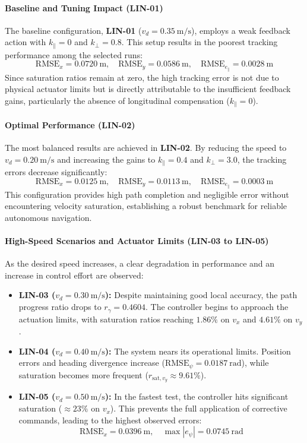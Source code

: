 \paragraph{Baseline and Tuning Impact (LIN-01)}
The baseline configuration, \textbf{LIN-01} ($v_d = 0.35~\mathrm{m/s}$), employs a weak feedback action with $k_{\parallel}=0$ and $k_{\perp}=0.8$. This setup results in the poorest tracking performance among the selected runs:
\[
    \mathrm{RMSE}_x = 0.0720~\mathrm{m}, \quad \mathrm{RMSE}_y = 0.0586~\mathrm{m}, \quad \mathrm{RMSE}_{e_{\parallel}} = 0.0028~\mathrm{m}
\]
Since saturation ratios remain at zero, the high tracking error is not due to physical actuator limits but is directly attributable to the insufficient feedback gains, particularly the absence of longitudinal compensation ($k_{\parallel}=0$).

\paragraph{Optimal Performance (LIN-02)}
The most balanced results are achieved in \textbf{LIN-02}. By reducing the speed to $v_d = 0.20~\mathrm{m/s}$ and increasing the gains to $k_{\parallel}=0.4$ and $k_{\perp}=3.0$, the tracking errors decrease significantly:
\[
    \mathrm{RMSE}_x = 0.0125~\mathrm{m}, \quad \mathrm{RMSE}_y = 0.0113~\mathrm{m}, \quad \mathrm{RMSE}_{e_{\parallel}} = 0.0003~\mathrm{m}
\]
This configuration provides high path completion and negligible error without encountering velocity saturation, establishing a robust benchmark for reliable autonomous navigation.

\paragraph{High-Speed Scenarios and Actuator Limits (LIN-03 to LIN-05)}
As the desired speed increases, a clear degradation in performance and an increase in control effort are observed:

\begin{itemize}
    \item \textbf{LIN-03 ($v_d = 0.30~\mathrm{m/s}$):} Despite maintaining good local accuracy, the path progress ratio drops to $r_{\gamma} = 0.4604$. The controller begins to approach the actuation limits, with saturation ratios reaching $1.86\%$ on $v_x$ and $4.61\%$ on $v_y$.
    \item \textbf{LIN-04 ($v_d = 0.40~\mathrm{m/s}$):} The system nears its operational limits. Position errors and heading divergence increase ($\mathrm{RMSE}_{\psi} = 0.0187~\mathrm{rad}$), while saturation becomes more frequent ($r_{\mathrm{sat},v_y} \approx 9.61\%$).
    \item \textbf{LIN-05 ($v_d = 0.50~\mathrm{m/s}$):} In the fastest test, the controller hits significant saturation ($\approx 23\%$ on $v_x$). This prevents the full application of corrective commands, leading to the highest observed errors:
    \[
        \mathrm{RMSE}_x = 0.0396~\mathrm{m}, \quad \max |e_{\psi}| = 0.0745~\mathrm{rad}
    \]
\end{itemize}


